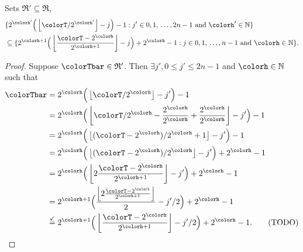 \begin{sublemma}
\label{thm:tilted-subsetr}
Sets $\mathfrak{R}' \subseteq \mathfrak{R}$,
\begin{align*}
&\{
  2^{\colorh'}\Big(\left\lfloor \colorT / 2^{\colorh'} \right\rfloor - j\Big) - 1
  :
  j' \in 0,1,\,\ldots,2n-1
  \text{ and }
  \colorh' \in \mathbb{N}
\}\\
&\subseteq
\{
  2^{\colorh + 1}\Big( \left\lfloor\frac{\colorT - 2^{\colorh}}{2^{\colorh + 1}} \right\rfloor - j\Big) + 2^{\colorh} - 1
  :
  j \in 0,1,\,\ldots,n-1
  \text{ and }
  \colorh \in \mathbb{N}
\}.
\end{align*}

\end{sublemma}
\begin{proof}
Suppose $\colorTbar \in \mathfrak{R}'$.
Then $\exists j',  0 \leq j' \leq 2n - 1$ and $\colorh \in \mathbb{N}$ such that
\begin{align*}
\colorTbar
&= 2^{\colorh}\Big(\left\lfloor \colorT / 2^{\colorh} \right\rfloor - j'\Big) - 1\\
&= 2^{\colorh}\Big(\left\lfloor \colorT / 2^{\colorh} - \frac{2^{\colorh}}{2^{\colorh}} + \frac{2^{\colorh}}{2^{\colorh}} \right\rfloor - j'\Big) - 1\\
&= 2^{\colorh}\Big(\left\lfloor (\colorT - 2^{\colorh}) / 2^{\colorh}  + 1 \right\rfloor - j'\Big) - 1\\
&= 2^{\colorh}\Big(\left\lfloor (\colorT - 2^{\colorh}) / 2^{\colorh} \right\rfloor - j'\Big) + 2^{\colorh} - 1\\
&= 2^{\colorh}\Big(\left\lfloor 2\frac{\colorT - 2^{\colorh}}{2^{\colorh+1}} \right\rfloor - j'\Big) + 2^{\colorh} - 1\\
&= 2^{\colorh+1}\Big(
  \frac{\left\lfloor 2\frac{\colorT - 2^{\colorh}}{2^{\colorh+1}} \right\rfloor}{2} - j'/2
\Big) + 2^{\colorh} - 1\\
&\stackrel{\checkmark}{=} 2^{\colorh+1}\Big(
  \left\lfloor\frac{\colorT - 2^{\colorh}}{2^{\colorh+1}} \right\rfloor - j'/2
\Big) + 2^{\colorh} - 1.  \tag{TODO}
\end{align*}



\end{proof}
